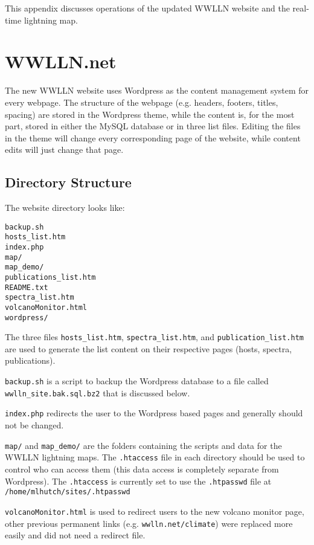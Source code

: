 This appendix discusses operations of the updated WWLLN website and the real-time lightning map.

\section{WWLLN.net}

The new WWLLN website uses Wordpress as the content management system for every webpage.
The structure of the webpage (e.g. headers, footers, titles, spacing) are stored in the Wordpress theme, while the content is, for the most part, stored in either the MySQL database or in three list files.
Editing the files in the theme will change every corresponding page of the website, while content edits will just change that page.

\subsection{Directory Structure}

The website directory looks like:

\begin{verbatim}
backup.sh
hosts_list.htm
index.php
map/
map_demo/
publications_list.htm
README.txt
spectra_list.htm
volcanoMonitor.html
wordpress/
\end{verbatim}

The three files \texttt{hosts\_list.htm}, \texttt{spectra\_list.htm}, and \texttt{publication\_list.htm} are used to generate the list content on their respective pages (hosts, spectra, publications).  

\texttt{backup.sh} is a script to backup the Wordpress database to a file called \texttt{wwlln\_site.bak.sql.bz2} that is discussed below.

\texttt{index.php} redirects the user to the Wordpress based pages and generally should not be changed.

\texttt{map/} and \texttt{map\_demo/} are the folders containing the scripts and data for the WWLLN lightning maps.
The \texttt{.htaccess} file in each directory should be used to control who can access them (this data access is completely separate from Wordpress).
The \texttt{.htaccess} is currently set to use the \texttt{.htpasswd} file at \texttt{/home/mlhutch/sites/.htpasswd}

\texttt{volcanoMonitor.html} is used to redirect users to the new volcano monitor page, other previous permanent links (e.g. \texttt{wwlln.net/climate}) were replaced more easily and did not need a redirect file.

